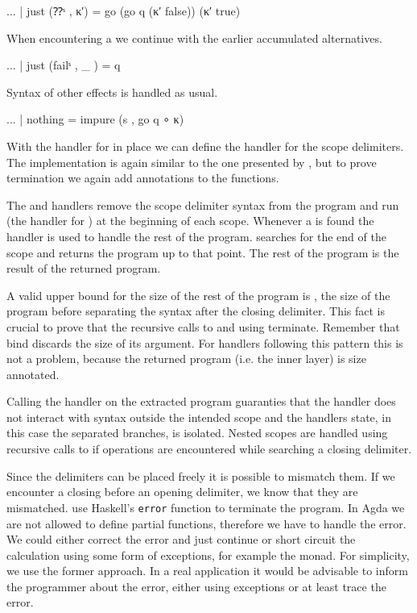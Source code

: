 \begin{AgdaAlign}
\begin{code}
    ... | just (⁇ˢ     , κ′)  = go (go q (κ′ false)) (κ′ true)
\end{code}
When encountering a  we continue with the earlier accumulated
alternatives.

\begin{code}
    ... | just (failˢ  , _ )  = q
\end{code}
Syntax of other effects is handled as usual.

\begin{code}
    ... | nothing             = impure (s , go q ∘ κ)
\end{code}
\end{AgdaAlign}
With the handler for  in place we can define the handler for the
scope delimiters.
The implementation is again similar to the one presented by
\textcite{DBLP:conf/haskell/WuSH14}, but to prove termination we again add
 annotations to the functions.

The  and  handlers remove the scope
delimiter syntax from the program and run  (the handler
for ) at the beginning of each scope.
Whenever a  is found the handler  is
used to handle the rest of the program.
 searches for the end of the scope and returns the program
up to that point.
The rest of the program is the result of the returned program.

A valid upper bound for the size of the rest of the program is ,
the size of the program before separating the syntax after the closing delimiter.
This fact is crucial to prove that the recursive calls to  and
 using \AgdaFunction{>>=} terminate.
Remember that bind discards the size of its argument.
For handlers following this pattern this is not a problem, because the returned
program (i.e. the inner  layer) is size annotated.

Calling the handler on the extracted program guaranties that the handler does
not interact with syntax outside the intended scope and the handlers state, in
this case the separated branches, is isolated.
Nested scopes are handled using recursive calls to  if
 operations are encountered while searching a closing
delimiter.

Since the delimiters can be placed freely it is possible to mismatch them.
If we encounter a closing before an opening delimiter, we know that they are
mismatched.
\textcite{DBLP:conf/haskell/WuSH14} use Haskell's \texttt{error} function to
terminate the program.
In Agda we are not allowed to define partial functions, therefore we have to
handle the error.
We could either correct the error and just continue or short circuit the
calculation using some form of exceptions, for example the 
monad.
For simplicity, we use the former approach.
In a real application it would be advisable to inform the programmer about the
error, either using exceptions or at least trace the error.

